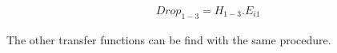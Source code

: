 \documentclass{osa-article}
\begin{document}
\begin{equation}
\begin{split}
Drop_{1-3}=H_{1-3}.E_{i1}
\end{split}
\end{equation}

The other transfer functions can be find with the same procedure.\\



%


 
%
%
%
%
\end{document}
